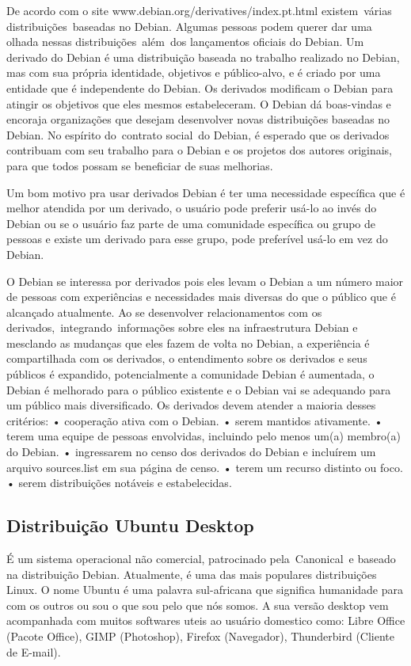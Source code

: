 De acordo com o site www.debian.org/derivatives/index.pt.html existem várias distribuições baseadas no Debian. Algumas pessoas podem querer dar uma olhada nessas distribuições além dos lançamentos oficiais do Debian. Um derivado do Debian é uma distribuição baseada no trabalho realizado no Debian, mas com sua própria identidade, objetivos e público-alvo, e é criado por uma entidade que é independente do Debian. Os derivados modificam o Debian para atingir os objetivos que eles mesmos estabeleceram. O Debian dá boas-vindas e encoraja organizações que desejam desenvolver novas distribuições baseadas no Debian. No espírito do contrato social do Debian, é esperado que os derivados contribuam com seu trabalho para o Debian e os projetos dos autores originais, para que todos possam se beneficiar de suas melhorias.

Um bom motivo pra usar derivados Debian é ter uma necessidade específica que é melhor atendida por um derivado, o usuário pode preferir usá-lo ao invés do Debian ou se o usuário faz parte de uma comunidade específica ou grupo de pessoas e existe um derivado para esse grupo, pode preferível usá-lo em vez do Debian.

O Debian se interessa por derivados pois eles levam o Debian a um número maior de pessoas com experiências e necessidades mais diversas do que o público que é alcançado atualmente. Ao se desenvolver relacionamentos com os derivados, integrando informações sobre eles na infraestrutura Debian e mesclando as mudanças que eles fazem de volta no Debian, a experiência é compartilhada com os derivados, o entendimento sobre os derivados e seus públicos é expandido, potencialmente a comunidade Debian é aumentada, o Debian é melhorado para o público existente e o Debian vai se adequando para um público mais diversificado. Os derivados devem atender a maioria desses critérios:
• cooperação ativa com o Debian.
• serem mantidos ativamente.
• terem uma equipe de pessoas envolvidas, incluindo pelo menos um(a) membro(a) do Debian.
• ingressarem no censo dos derivados do Debian e incluírem um arquivo sources.list em sua página de censo.
• terem um recurso distinto ou foco.
• serem distribuições notáveis e estabelecidas. 

\subsection{Distribuição Ubuntu Desktop}

É um sistema operacional não comercial, patrocinado pela Canonical e baseado na distribuição Debian. Atualmente, é uma das mais populares distribuições Linux. O nome Ubuntu é uma palavra sul-africana que significa humanidade para com os outros ou sou o que sou pelo que nós somos. A sua versão desktop vem acompanhada com muitos softwares uteis ao usuário domestico como: Libre Office (Pacote Office), GIMP (Photoshop), Firefox (Navegador), Thunderbird (Cliente de E-mail).

